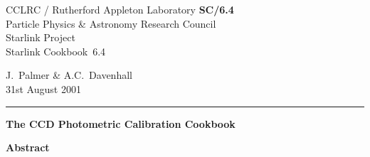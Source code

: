 \documentclass[twoside,11pt]{article}
\newcommand{\stardoccategory}  {Starlink Cookbook}
\newcommand{\stardocinitials}  {SC}
\newcommand{\stardocnumber}    {6.4}
\newcommand{\stardocauthors}   {J.~Palmer \& A.C.~Davenhall}
\newcommand{\stardocdate}      {31st August 2001}
\newcommand{\stardoctitle}     {The CCD Photometric Calibration Cookbook}
\newcommand{\stardocname}{\stardocinitials /\stardocnumber}
\begin{document}
\thispagestyle{empty}

\begin{latex}
   CCLRC / {\sc Rutherford Appleton Laboratory} \hfill {\bf \stardocname}\\
   {\large Particle Physics \& Astronomy Research Council}\\
   {\large Starlink Project\\}
   {\large \stardoccategory\ \stardocnumber}
   \begin{flushright}
   \stardocauthors\\
   \stardocdate
   \end{flushright}
   \vspace{-4mm}
   \rule{\textwidth}{0.5mm}
   \vspace{5mm}
   \begin{center}
   {\Huge\bf  \stardoctitle \\ [2.5ex]}
   \end{center}
   \vspace{5mm}


   \vspace{10mm}
   \begin{center}
      {\Large\bf Abstract}
   \end{center}
\end{latex}
\end{document}
